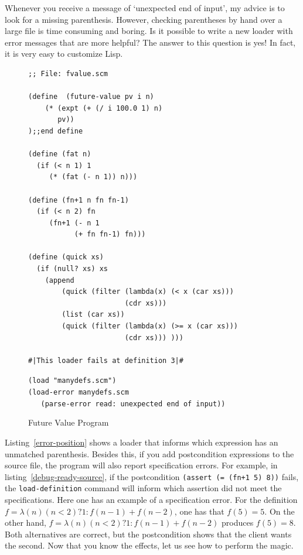 \documentclass[a4paper,12pt]{book}
\newenvironment{fmpage}[1]
               {\begin{lrbox}{\fmbox}\begin{minipage}{#1}}
               {\end{minipage}\end{lrbox}\fbox{\usebox{\fmbox}}}
\begin{document}
Whenever you receive a message
of `unexpected end of input', my advice is to
look for a missing parenthesis.
However, checking parentheses by hand over a large file is
time consuming and boring. Is it possible
to write a new loader with error messages
that are more helpful? The answer to this
question is yes! In fact, it is very easy
to customize Lisp.

\begin{figure}[!h]
\begin{fmpage}{0.8\textwidth}
\begin{verbatim}
;; File: fvalue.scm

(define  (future-value pv i n)
    (* (expt (+ (/ i 100.0 1) n) 
       pv))
);;end define

(define (fat n)
  (if (< n 1) 1
     (* (fat (- n 1)) n)))

(define (fn+1 n fn fn-1)
  (if (< n 2) fn
     (fn+1 (- n 1
           (+ fn fn-1) fn)))

(define (quick xs)
  (if (null? xs) xs
    (append
        (quick (filter (lambda(x) (< x (car xs)))
                       (cdr xs)))
        (list (car xs))
        (quick (filter (lambda(x) (>= x (car xs)))
                       (cdr xs))) )))

#|This loader fails at definition 3|#
\end{verbatim}
\end{fmpage}

\begin{fmpage}{0.8\textwidth}
  \verb|(load "manydefs.scm")|\\
  \verb|(load-error manydefs.scm |\\
  \verb|   (parse-error read: unexpected end of input))|\\
\end{fmpage}
\caption{Future Value Program}
\label{missing-semiColon}
\end{figure}

Listing~\ref{error-position} shows a loader
that informs which expression has an unmatched
parenthesis. Besides this, if you add postcondition
expressions to the source file, the program
will also report specification errors.
For example, in listing~\ref{debug-ready-source},
if the postcondition
\verb|(assert (= (fn+1 5) 8))| fails,
the \verb|load-definition| command will
inform which assertion did not meet
the specifications. Here one has an
example of a specification error. 
For the definition
$f= \lambda(n) (n<2) ? 1 : f(n-1)+f(n-2)$,
one has that $f(5)= 5$. On  the other hand, 
$f=\lambda(n) (n<2) ? 1 : f(n-1)+f(n-2)$
 produces $f(5)= 8$.
 Both alternatives are correct, but the postcondition
 shows that the client wants the second.
Now that you know the
effects, let us see how to perform the magic.
\end{document}
